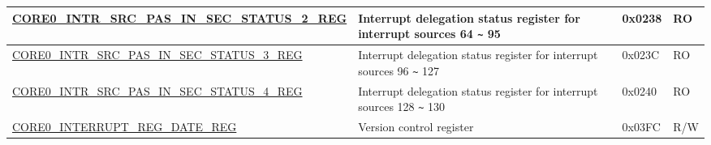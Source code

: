 \begin{longtable}{ | p{7.5cm} | p{7.2cm} | p{1.3cm} | p{1cm} | }
\hyperref[regdesc:CORE0INTRSRCPASSINSECSTATUS2REG]{CORE0\_INTR\_SRC\_PAS\_IN\_SEC\_STATUS\_2\_REG} & Interrupt delegation status register for interrupt sources 64 \verb+~+ 95  & 0x0238 & RO \\ \hline

\hyperref[regdesc:CORE0INTRSRCPASSINSECSTATUS3REG]{CORE0\_INTR\_SRC\_PAS\_IN\_SEC\_STATUS\_3\_REG} & Interrupt delegation status register for interrupt sources 96 \verb+~+ 127  & 0x023C & RO \\ \hline

\hyperref[regdesc:CORE0INTRSRCPASSINSECSTATUS4REG]{CORE0\_INTR\_SRC\_PAS\_IN\_SEC\_STATUS\_4\_REG} & Interrupt delegation status register for interrupt sources 128 \verb+~+ 130  & 0x0240 & RO \\ \hline


\hyperref[regdesc:CORE0INTERRUPTREGDATEREG]{CORE0\_INTERRUPT\_REG\_DATE\_REG} & Version control register & 0x03FC & R/W \\ \hline
\end{longtable}
